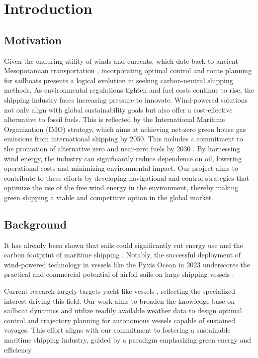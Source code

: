 \documentclass[conference]{IEEEtran}
\begin{document}
\section{Introduction}

\subsection{Motivation}
Given the enduring utility of winds and currents, which date back to ancient Mesopotamian transportation \cite{Carter2012Watercraft}, incorporating optimal control and route planning for sailboats presents a logical evolution in seeking carbon-neutral shipping methods. As environmental regulations tighten and fuel costs continue to rise, the shipping industry faces increasing pressure to innovate. Wind-powered solutions not only align with global sustainability goals but also offer a cost-effective alternative to fossil fuels. This is reflected by the International Maritime Organization (IMO) strategy, which aims at achieving net-zero green house gas emissions from international shipping by 2050. This includes a commitment to the promotion of alternative zero and near-zero fuels by 2030 \cite{UNCTAD2023}. By harnessing wind energy, the industry can significantly reduce dependence on oil, lowering operational costs and minimizing environmental impact. Our project aims to contribute to these efforts by developing navigational and control strategies that optimize the use of the free wind energy in the environment, thereby making green shipping a viable and competitive option in the global market.

\subsection{Background}
It has already been shown that sails could significantly cut energy use and the carbon footprint of maritime shipping \cite{Michael2014PropulsivePower}. Notably, the successful deployment of wind-powered technology in vessels like the Pyxis Ocean in 2023 underscores the practical and commercial potential of airfoil sails on large shipping vessels \cite{Lewis2023WindPowered}.

Current research largely targets yacht-like vessels \cite{ModelingCourseControl, RollController, Saoud2015OptimalSail}, reflecting the specialized interest driving this field. Our work aims to broaden the knowledge base on sailboat dynamics and utilize readily available weather data \cite{ERA5} to design optimal control and trajectory planning for autonomous vessels capable of sustained voyages. This effort aligns with our commitment to fostering a sustainable maritime shipping industry, guided by a paradigm emphasizing green energy and efficiency.
\end{document}
